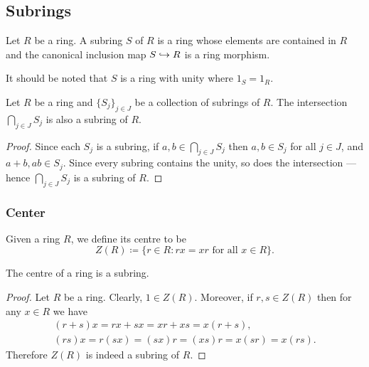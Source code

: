 \subsection{Subrings}

%
\begin{definition}[Subring]
    \label{def:subring}
    Let \(R\) be a ring. A subring \(S\) of \(R\) is a ring whose elements are
    contained in \(R\) and the canonical inclusion map \(S \hookrightarrow R\) is a ring
    morphism.
\end{definition}
%

%
\begin{remark}
    \label{rem:subring-same-unity}
    It should be noted that \(S\) is a ring with unity where \(1_S = 1_R\).
\end{remark}
%

%
\begin{proposition}
    \label{prop:intersection-subring-is-subring}
    Let \(R\) be a ring and \(\{S_{j}\}_{j \in J}\) be a collection of subrings of
    \(R\). The intersection \(\bigcap_{j \in J} S_j\) is also a subring of \(R\).
\end{proposition}
%

%
\begin{proof}
    Since each \(S_j\) is a subring, if \(a, b \in \bigcap_{j \in J} S_j\) then \(a,
    b \in S_j\) for all \(j \in J\), and \(a + b, a b \in S_j\). Since every subring
    contains the unity, so does the intersection --- hence \(\bigcap_{j \in J} S_j\)
    is a subring of \(R\).
\end{proof}
%


\subsubsection{Center}

%
\begin{definition}[Center]
    \label{def:ring-center}
    Given a ring \(R\), we define its centre to be
    \[
        Z(R) \coloneq \{r \in R \colon r x = x r \text{ for all } x \in R\}.
    \]
\end{definition}
%

%
\begin{corollary}
    \label{cor:center-is-subring}
    The centre of a ring is a subring.
\end{corollary}
%

%
\begin{proof}
    Let \(R\) be a ring. Clearly, \(1 \in Z(R)\). Moreover, if \(r, s \in Z(R)\)
    then for any \(x \in R\) we have
    \begin{gather*}
        (r + s) x = r x + s x = x r + x s = x (r + s), \\
        (r s) x = r(s x) = (s x) r = (x s) r = x (s r) = x (r s).
    \end{gather*}
    Therefore \(Z(R)\) is indeed a subring of \(R\).
\end{proof}
%

